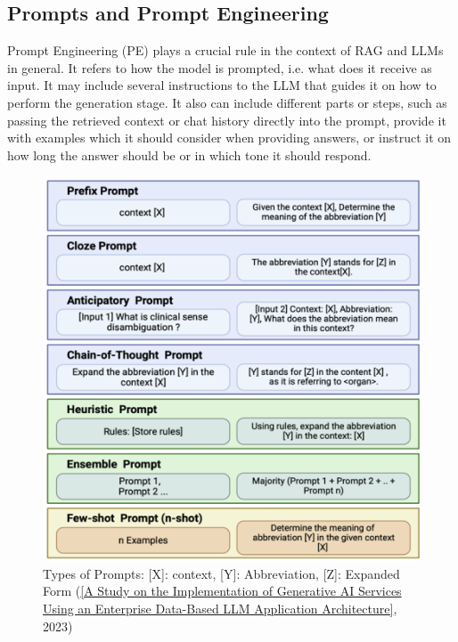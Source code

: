 \subsection{Prompts and Prompt Engineering}
Prompt Engineering (PE) plays a crucial rule in the context of RAG and LLMs in general. It refers to how the model is prompted, i.e. what does it receive as input. It may include several instructions to the LLM that guides it on how to perform the generation stage. It also can include different parts or steps, such as passing the retrieved context or chat history directly into the prompt, provide it with examples which it should consider when providing answers, or instruct it on how long the answer should be or in which tone it should respond.
\begin{figure}[htbp]
    \centering
    \includegraphics[width=\linewidth]{./figures/prompt-types.png}
    \caption{Types of Prompts: [X]: context, [Y]: Abbreviation, [Z]: Expanded Form
    (\href{https://www.oajaiml.com/uploads/archivepdf/63501191.pdf}{[A Study on the Implementation of Generative AI Services Using an Enterprise Data-Based LLM Application Architecture]}, 2023)}
\end{figure}